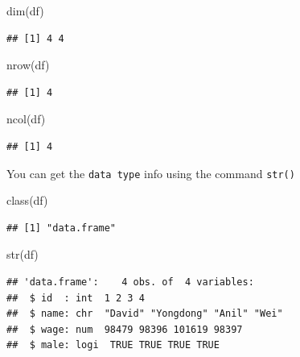 \documentclass[
  11pt,
]{book}
\newenvironment{Shaded}{\begin{snugshade}}{\end{snugshade}}
\newcommand{\FunctionTok}[1]{\textcolor[rgb]{0.00,0.00,0.00}{#1}}
\newcommand{\NormalTok}[1]{#1}
\begin{document}
\begin{Shaded}
\begin{Highlighting}[]
\FunctionTok{dim}\NormalTok{(df)}
\end{Highlighting}
\end{Shaded}

\begin{verbatim}
## [1] 4 4
\end{verbatim}

\begin{Shaded}
\begin{Highlighting}[]
\FunctionTok{nrow}\NormalTok{(df)}
\end{Highlighting}
\end{Shaded}

\begin{verbatim}
## [1] 4
\end{verbatim}

\begin{Shaded}
\begin{Highlighting}[]
\FunctionTok{ncol}\NormalTok{(df)}
\end{Highlighting}
\end{Shaded}

\begin{verbatim}
## [1] 4
\end{verbatim}

You can get the \texttt{data\ type} info using the command \texttt{str()}

\begin{Shaded}
\begin{Highlighting}[]
\FunctionTok{class}\NormalTok{(df)}
\end{Highlighting}
\end{Shaded}

\begin{verbatim}
## [1] "data.frame"
\end{verbatim}

\begin{Shaded}
\begin{Highlighting}[]
\FunctionTok{str}\NormalTok{(df)}
\end{Highlighting}
\end{Shaded}

\begin{verbatim}
## 'data.frame':    4 obs. of  4 variables:
##  $ id  : int  1 2 3 4
##  $ name: chr  "David" "Yongdong" "Anil" "Wei"
##  $ wage: num  98479 98396 101619 98397
##  $ male: logi  TRUE TRUE TRUE TRUE
\end{verbatim}
\end{document}

